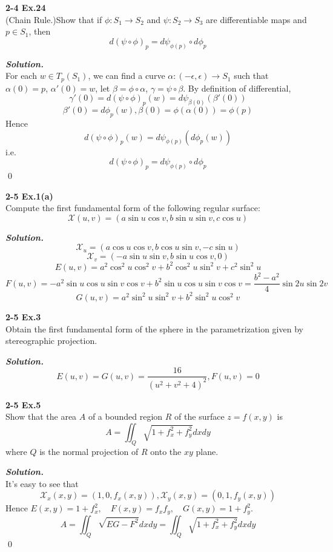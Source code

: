 \documentclass{article}
\begin{document}
\par
\textbf{2-4 Ex.24}\\
(Chain Rule.)Show that if $\phi: S_1 \to S_2$ and 
$\psi: S_2 \to S_3$ are differentiable maps and $p \in S_1$,
then
$$
    d(\psi \circ \phi)_p = d \psi_{\phi(p)} \circ d \phi_p
$$

\par
\textbf{\textit{Solution.}}\\
For each $w \in T_p(S_1)$, we can find a curve
$\alpha: (-\epsilon, \epsilon) \to S_1$ such that
$\alpha(0)=p$, $\alpha'(0)=w$, let $\beta = \phi \circ \alpha$,
$\gamma = \psi \circ \beta$.
By definition of differential,
$$
    \gamma'(0) = d(\psi \circ \phi)_p(w) = d\psi_{\beta(0)}(\beta'(0))
$$
$$
    \beta'(0) = d\phi_p(w), \beta(0)=\phi(\alpha(0))=\phi(p)
$$
Hence
$$
d(\psi \circ \phi)_p(w) = d\psi_{\phi(p)}(d\phi_p(w))
$$
i.e.
$$
d(\psi \circ \phi)_p = d\psi_{\phi(p)} \circ d\phi_p
$$
\qed

\par
\textbf{2-5 Ex.1(a)}\\
Compute the first fundamental form of the following
regular surface:
$$
\mathcal{X}(u,v)=(a \sin u \cos v, b \sin u \sin v, c \cos u)
$$

\par
\textbf{\textit{Solution.}}\\
$$
    \mathcal{X}_u = (a \cos u \cos v, b \cos u \sin v, -c \sin u)
$$
$$
    \mathcal{X}_v = (-a \sin u \sin v, b \sin u \cos v, 0)
$$
$$
    E(u,v)=a^2 \cos^2 u \cos^2 v + b^2 \cos^2 u \sin^2 v + c^2 \sin^2 u
$$
$$
    F(u,v)=-a^2 \sin u \cos u \sin v \cos v + b^2 \sin u \cos u \sin v \cos v = \frac{b^2-a^2}{4}\sin 2u \sin 2v
$$
$$
    G(u,v)=a^2 \sin^2 u \sin^2 v + b^2 \sin^2 u \cos^2 v
$$

\par
\textbf{2-5 Ex.3}\\
Obtain the first fundamental form of the sphere in the
parametrization given by stereographic projection.

\par
\textbf{\textit{Solution.}}
$$
    E(u,v)=G(u,v)=\frac{16}{(u^2+v^2+4)^2}, F(u,v)=0
$$

\par
\textbf{2-5 Ex.5}\\
Show that the area $A$ of a bounded region $R$ of the surface
$z=f(x,y)$ is
$$
    A = \iint_{Q}\sqrt{1+f_x^2+f_y^2}dxdy
$$
where $Q$ is the normal projection of $R$ onto the $xy$ plane.

\par
\textbf{\textit{Solution.}}\\
It's easy to see that
$$
    \mathcal{X}_x(x,y) = (1, 0, f_x(x,y)), \mathcal{X}_y(x,y) = (0, 1, f_y(x,y))
$$
Hence $E(x,y)=1+f_x^2, \quad F(x,y)=f_xf_y, \quad G(x,y)=1+f_y^2$.
$$
A = \iint_Q\sqrt{EG-F^2}dxdy = \iint_Q\sqrt{1+f_x^2+f_y^2}dxdy
$$
\qed
\end{document}
